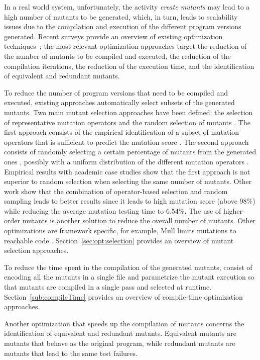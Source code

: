 In a real world system, unfortunately, the activity \emph{create mutants} may lead to a high number of mutants to be generated, which, in turn, leads to scalability issues due to the compilation and execution of the different program versions generated. Recent surveys provide an overview of existing optimization techniques~\cite{ferrari2018systematic};
the most relevant optimization approaches target the reduction of the number of mutants to be compiled and executed, 
the reduction of the compilation iterations, the reduction of the execution time, and the identification of equivalent and redundant mutants.

To reduce the number of program versions that need to be compiled and executed, existing approaches automatically select subsets of the generated mutants. Two main mutant selection approaches have been defined: the selection of representative mutation operators and the random selection of mutants \cite{zhang2010operator}. The first approach consists of the empirical identification of a subset of mutation operators that is sufficient to predict the mutation score \cite{siami2008sufficient,barbosa2001toward}. The second approach consists of randomly selecting a certain percentage of mutants from the generated ones \cite{wong1995reducing}, possibly with a uniform distribution of the different mutation operators \cite{zhang2010operator}. Empirical results with academic case studies \cite{zhang2010operator} show that the first approach is not superior to random selection when selecting the same number of mutants. Other work \cite{zhang2013operator} show that the combination of operator-based selection and random sampling leads to better results since it leads to high mutation score (above 98\%) while reducing the average mutation testing time to 6.54\%. The use of higher-order mutants is another solution to reduce the overall number of mutants. 
Other optimizations are framework specific, for example, Mull limits mutations to reachable code \cite{hariri2018srciror}. Section~\ref{sec:opt:selection} provides an overview of mutant selection approaches.

To reduce the time spent in the compilation of the generated mutants,  \cite{untch1993mutation} consist of encoding all the mutants in a single file and parametrize the mutant execution so that mutants are compiled in a single pass and selected at runtime. Section~\ref{sub:compileTime} provides an overview of compile-time optimization approaches.

Another optimization that speeds up the compilation of mutants concerns the identification of equivalent and redundant mutants. Equivalent mutants are mutants that behave as the original program, while redundant mutants are mutants that lead to the same test failures. 


